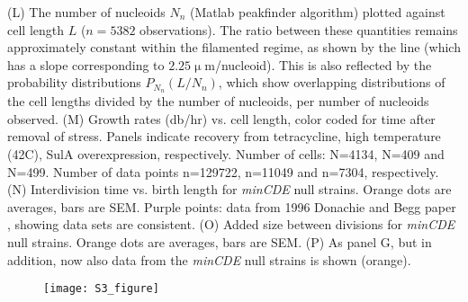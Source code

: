 {(L) The number of nucleoids $N_n$ (Matlab peakfinder algorithm) plotted against cell length $L$ ($n = 5382$ observations). The ratio between these quantities remains approximately constant within the filamented regime, as shown by the line (which has a slope corresponding to $2.25 \upmu$m/nucleoid). This is also reflected by the probability distributions $P_{N_n}(L/N_n)$, which show overlapping distributions of the cell lengths divided by the number of nucleoids, per number of nucleoids observed. 
(M) Growth rates (db/hr) vs. cell length, color coded for time after removal of stress. Panels indicate recovery from tetracycline, high temperature (42C), SulA overexpression, respectively. Number of cells: N=4134, N=409 and N=499. Number of data points n=129722, n=11049 and n=7304, respectively. 
(N) Interdivision time vs. birth length for \textit{minCDE} null strains. Orange dots are averages, bars are SEM. Purple points: data from 1996 Donachie and Begg paper \cite{Donachie1996}, showing data sets are consistent.
(O) Added size between divisions for \textit{minCDE} null strains. Orange dots are averages, bars are SEM. 
(P) As panel G, but in addition, now also data from the \textit{minCDE} null strains is shown (orange).}




\begin{figure}
	\centering
	\texttt{[image: S3\_figure]}
\end{figure}	
\clearpage
{}


